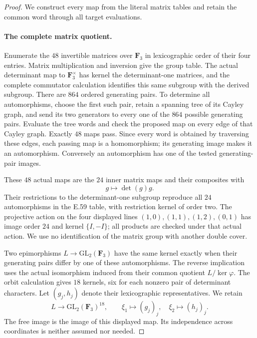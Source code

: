 \begin{proof}
We construct every map from the literal matrix tables and retain the
common word through all target evaluations.

\paragraph{The complete matrix quotient.}
Enumerate the $48$ invertible matrices over $\mathbf F_3$ in lexicographic
order of their four entries.  Matrix multiplication and inversion give
the group table.  The actual determinant map to $\mathbf F_3^\times$
has kernel the determinant-one matrices, and the complete commutator
calculation identifies this same subgroup with the derived subgroup.
There are $864$ ordered generating pairs.  To determine all automorphisms,
choose the first such pair, retain a spanning tree of its Cayley graph,
and send its two generators to every one of the $864$ possible generating
pairs.  Evaluate the tree words and check the proposed map on every
edge of that Cayley graph.  Exactly $48$ maps pass.  Since every word
is obtained by traversing these edges, each passing map is a homomorphism;
its generating image makes it an automorphism.  Conversely an
automorphism has one of the tested generating-pair images.

These $48$ actual maps are the $24$ inner matrix maps and their composites
with
\[
 g\longmapsto\det(g)g.
 \tag{E.62.7}
\]
Their restrictions to the determinant-one subgroup reproduce all $24$
automorphisms in the E.59 table, with restriction kernel of order two.
The projective action on the four displayed lines
$(1,0),(1,1),(1,2),(0,1)$ has image order $24$ and kernel $\{I,-I\}$;
all products are checked under that actual action.  We use no
identification of the matrix group with another double cover.

Two epimorphisms $L\to\mathrm{GL}_2(\mathbf F_3)$ have the same kernel
exactly when their generating pairs differ by one of these automorphisms.
The reverse implication uses the actual isomorphism induced from their
common quotient $L/\ker\varphi$.  The orbit calculation gives $18$
kernels, six for each nonzero pair of determinant characters.  Let
$(g_j,h_j)$ denote their lexicographic representatives.  We retain
\[
 L\longrightarrow\mathrm{GL}_2(\mathbf F_3)^{18},\qquad
 \xi_1\longmapsto(g_j)_j,\quad\xi_2\longmapsto(h_j)_j.
 \tag{E.62.8}
\]
The free image is the image of this displayed map.  Its independence
across coordinates is neither assumed nor needed.


\end{proof}
